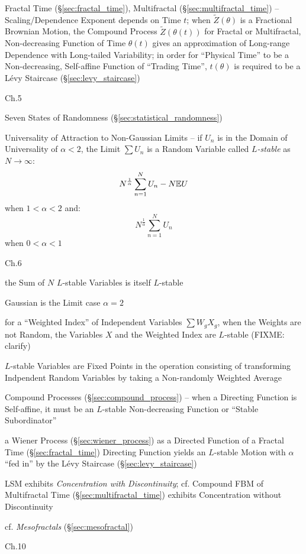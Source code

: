 \fist Fractal Time (\S\ref{sec:fractal_time}), Multifractal
(\S\ref{sec:multifractal_time}) -- Scaling/Dependence Exponent depends on Time
$t$; when $\tilde{Z}(\theta)$ is a Fractional Brownian Motion, the Compound
Process $\tilde{Z}(\theta(t))$ for Fractal or Multifractal, Non-decreasing
Function of Time $\theta(t)$ gives an approximation of Long-range Dependence
with Long-tailed Variability; in order for ``Physical Time'' to be a
Non-decreasing, Self-affine Function of ``Trading Time'', $t(\theta)$ is
required to be a L\'evy Staircase (\S\ref{sec:levy_staircase})

Ch.5

\fist Seven States of Randomness (\S\ref{sec:statistical_randomness})

Universality of Attraction to Non-Gaussian Limits -- if $U_n$ is in the Domain
of Universality of $\alpha < 2$, the Limit $\sum U_n$ is a Random Variable
called \emph{$L$-stable} as $N \to \infty$:
\[
  N^\frac{1}{\alpha} \sum_{n=1}^N U_n - N \mathbb{E}{U}
\]
when $1 < \alpha < 2$ and:
\[
  N^\frac{1}{\alpha} \sum_{n=1}^N U_n
\]
when $0 < \alpha < 1$

Ch.6

the Sum of $N$ $L$-stable Variables is itself $L$-stable

Gaussian is the Limit case $\alpha = 2$

for a ``Weighted Index'' of Independent Variables $\sum W_g X_g$, when the
Weights are not Random, the Variables $X$ and the Weighted Index are $L$-stable
(FIXME: clarify)

$L$-stable Variables are Fixed Points in the operation consisting of
transforming Indpendent Random Variables by taking a Non-randomly Weighted
Average

Compound Processes (\S\ref{sec:compound_process}) -- when a Directing Function
is Self-affine, it must be an $L$-stable Non-decreasing Function or ``Stable
Subordinator''

a Wiener Process (\S\ref{sec:wiener_process}) as a Directed Function of a
Fractal Time (\S\ref{sec:fractal_time}) Directing Function yields an $L$-stable
Motion with $\alpha$ ``fed in'' by the L\'evy Staircase
(\S\ref{sec:levy_staircase})

LSM exhibits \emph{Concentration with Discontinuity}; cf. Compound FBM of
Multifractal Time (\S\ref{sec:multifractal_time}) exhibits Concentration without
Discontinuity

cf. \emph{Mesofractals} (\S\ref{sec:mesofractal})

Ch.10

